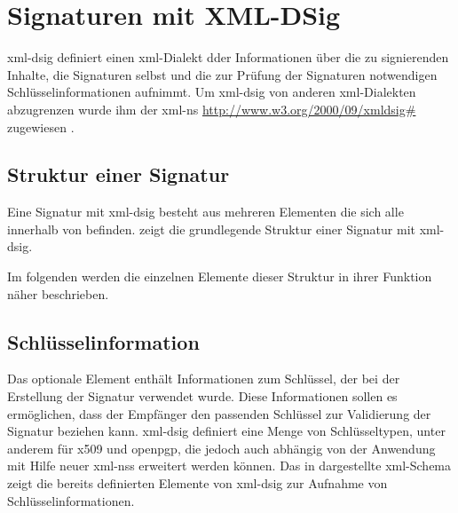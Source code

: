 
\chapter{Signaturen mit XML-DSig}
\label{chap:XML-DSig}
\gls{xml-dsig} definiert einen \gls{xml}-Dialekt dder Informationen über die zu signierenden Inhalte, die Signaturen selbst und die zur Prüfung der Signaturen
notwendigen Schlüsselinformationen aufnimmt. Um \gls{xml-dsig} von anderen \gls{xml}-Dialekten abzugrenzen wurde ihm der \gls{xml-ns}
\url{http://www.w3.org/2000/09/xmldsig#} zugewiesen \cite{xml-dsig:w3c}.

\section{Struktur einer Signatur}
Eine Signatur mit \gls{xml-dsig} besteht aus mehreren Elementen die sich alle innerhalb von  befinden.  zeigt
die grundlegende Struktur einer Signatur mit \gls{xml-dsig}.



Im folgenden werden die einzelnen Elemente dieser Struktur in ihrer Funktion näher beschrieben. 

\section{Schlüsselinformation}
Das optionale Element  enthält Informationen zum Schlüssel, der bei der Erstellung der Signatur verwendet wurde. Diese Informationen sollen es
ermöglichen, dass der Empfänger den passenden Schlüssel zur Validierung der Signatur beziehen kann. \gls{xml-dsig} definiert eine Menge von
Schlüsseltypen, unter anderem für \gls{x509} und \gls{openpgp}, die jedoch auch abhängig von der Anwendung mit Hilfe neuer \glspl{xml-ns} erweitert werden
können. Das in  dargestellte \gls{xml}-Schema zeigt die bereits definierten Elemente von \gls{xml-dsig} zur Aufnahme von
Schlüsselinformationen.



